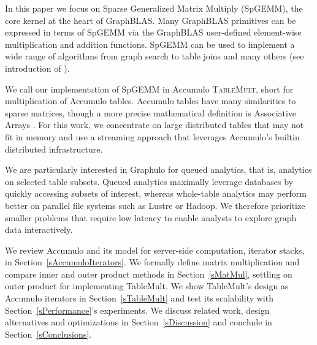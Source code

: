 
In this paper we focus on Sparse Generalized Matrix Multiply (SpGEMM), the core kernel at the heart of GraphBLAS.
Many GraphBLAS primitives can be expressed in terms of
SpGEMM via the GraphBLAS user-defined element-wise multiplication and addition functions. 
SpGEMM can be used to implement a wide range of algorithms 
from graph search \cite{kepner2011graph} to table joins \cite{cohen2009mad} 
and many others (see introduction of \cite{bulucc2010highly}).

We call our implementation of SpGEMM in Accumulo \textsc{TableMult}, short for multiplication of Accumulo tables.
Accumulo tables have many similarities to sparse matrices, though a more precise mathematical definition is Associative Arrays 
\cite{kepner2014gabb}. For this work, we concentrate on
large distributed tables that may not fit in memory and use a streaming
approach that leverages Accumulo's builtin distributed infrastructure.

We are particularly interested in Graphulo for queued analytics, that is, analytics on selected table subsets.  
Queued analytics maximally leverage  databases
by quickly accessing subsets of interest, 
whereas whole-table analytics may perform better on parallel file systems such as Lustre or Hadoop.
We therefore prioritize smaller problems that require low latency
to enable analysts to explore graph data interactively.


We review Accumulo and its model for server-side computation, iterator stacks, 
in Section~\ref{sAccumuloIterators}.
We formally define matrix multiplication and compare inner and outer product methods
in Section~\ref{sMatMul}, settling on outer product for implementing TableMult.
We show TableMult's design as Accumulo iterators in Section~\ref{sTableMult}
and test its scalability with Section~\ref{sPerformance}'s experiments.
We discuss related work, design alternatives and optimizations in Section~\ref{sDiscussion}
and conclude in Section~\ref{sConclusions}.

